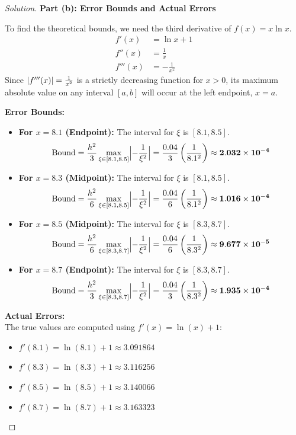 \documentclass[11pt, a4paper]{article}
\DeclarePairedDelimiter\abs{\lvert}{\rvert}
\newif\ifsolutionnewpage
\newenvironment{solution}
  {\begin{proof}[Solution]}
  {\end{proof}\ifsolutionnewpage\newpage\fi}
\begin{document}
\begin{solution}
    \vspace{0.3cm}
    \textbf{Part (b): Error Bounds and Actual Errors}
    
    To find the theoretical bounds, we need the third derivative of $f(x) = x \ln x$.
    \begin{align*}
    f'(x) &= \ln x + 1 \\
    f''(x) &= \frac{1}{x} \\
    f'''(x) &= -\frac{1}{x^2}
    \end{align*}
    Since $\abs{f'''(x)} = \frac{1}{x^2}$ is a strictly decreasing function for $x > 0$, its maximum absolute value on any interval $[a, b]$ will occur at the left endpoint, $x = a$.
    
    \vspace{0.2cm}
    \textbf{Error Bounds:}
    \begin{itemize}
        \item \textbf{For $x = 8.1$ (Endpoint):} The interval for $\xi$ is $[8.1, 8.5]$.
        $$ \text{Bound} = \frac{h^2}{3} \max_{\xi \in [8.1, 8.5]} \abs[\Big]{-\frac{1}{\xi^2}} = \frac{0.04}{3} \left( \frac{1}{8.1^2} \right) \approx \mathbf{2.032 \times 10^{-4}} $$
    
        \item \textbf{For $x = 8.3$ (Midpoint):} The interval for $\xi$ is $[8.1, 8.5]$.
        $$ \text{Bound} = \frac{h^2}{6} \max_{\xi \in [8.1, 8.5]} \abs[\Big]{-\frac{1}{\xi^2}} = \frac{0.04}{6} \left( \frac{1}{8.1^2} \right) \approx \mathbf{1.016 \times 10^{-4}} $$
    
        \item \textbf{For $x = 8.5$ (Midpoint):} The interval for $\xi$ is $[8.3, 8.7]$.
        $$ \text{Bound} = \frac{h^2}{6} \max_{\xi \in [8.3, 8.7]} \abs[\Big]{-\frac{1}{\xi^2}} = \frac{0.04}{6} \left( \frac{1}{8.3^2} \right) \approx \mathbf{9.677 \times 10^{-5}} $$
    
        \item \textbf{For $x = 8.7$ (Endpoint):} The interval for $\xi$ is $[8.3, 8.7]$.
        $$ \text{Bound} = \frac{h^2}{3} \max_{\xi \in [8.3, 8.7]} \abs[\Big]{-\frac{1}{\xi^2}} = \frac{0.04}{3} \left( \frac{1}{8.3^2} \right) \approx \mathbf{1.935 \times 10^{-4}} $$
    \end{itemize}
    
    \vspace{0.2cm}
    \textbf{Actual Errors:} \\
    The true values are computed using $f'(x) = \ln(x) + 1$:
    \begin{itemize}
        \item $f'(8.1) = \ln(8.1) + 1 \approx 3.091864$
        \item $f'(8.3) = \ln(8.3) + 1 \approx 3.116256$
        \item $f'(8.5) = \ln(8.5) + 1 \approx 3.140066$
        \item $f'(8.7) = \ln(8.7) + 1 \approx 3.163323$
    \end{itemize}
    

\end{solution}
\end{document}
